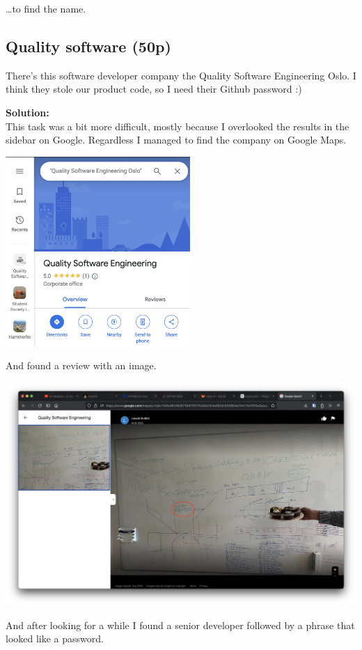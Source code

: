\dots to find the name.

\subsection{Quality software (50p)}
There's this software developer company the Quality Software Engineering Oslo. I think they stole our product code, so I need their Github password :)

\textbf{Solution:}\\
This task was a bit more difficult, mostly because I overlooked the results in the sidebar on Google. Regardless I managed to find the company on Google Maps.

\includegraphics[width=7cm]{img/OSINT/Quality software/Skjermbilde 2023-09-11 kl. 17.30.32.png}

And found a review with an image.

\includegraphics[width=16cm]{img/OSINT/Quality software/Skjermbilde 2023-09-06 kl. 11.54.53.png}

And after looking for a while I found a senior developer followed by a phrase that looked like a password.